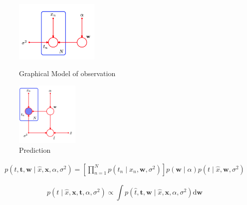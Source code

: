 \documentclass{article}
\begin{document}
\begin{figure}[htbp]
    \centering
    \begin{minipage}[t]{0.48\textwidth}
    \centering
    \includegraphics[width=4cm]{./images/2021-09-15-17-09-32.png}
    \caption{Graphical Model of observation} 
    \end{minipage}
    \begin{minipage}[t]{0.48\textwidth}
    \centering
    \includegraphics[width=3cm]{./images/2021-09-15-17-15-12.png}
    \caption{Prediction}
    \end{minipage}
\end{figure}
  




\begin{align}
    p\left(\widehat{t}, \mathbf{t}, \mathbf{w} \mid \widehat{x}, \mathbf{x}, \alpha, \sigma^{2}\right)=\left[\prod_{n=1}^{N} p\left(t_{n} \mid x_{n}, \mathbf{w}, \sigma^{2}\right)\right] p(\mathbf{w} \mid \alpha) p\left(t \mid \widehat{x}, \mathbf{w}, \sigma^{2}\right)
\end{align}

\begin{equation}
    p\left(t \mid \widehat{x}, \mathbf{x}, \mathbf{t}, \alpha, \sigma^{2}\right) \propto \int p\left(\widehat{t}, \mathbf{t}, \mathbf{w} \mid \widehat{x}, \mathbf{x}, \alpha, \sigma^{2}\right) \mathrm{d} \mathbf{w}
\end{equation}

\end{document}
